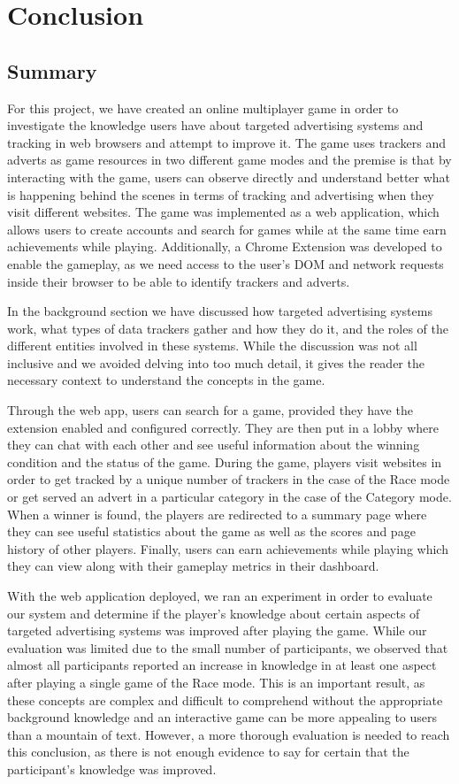 \documentclass{l4proj}
\begin{document}
\chapter{Conclusion}    

\section{Summary}
For this project, we have created an online multiplayer game in order to investigate the knowledge users have about targeted advertising systems and tracking in web browsers and attempt to improve it. The game uses trackers and adverts as game resources in two different game modes and the premise is that by interacting with the game, users can observe directly and understand better what is happening behind the scenes in terms of tracking and advertising when they visit different websites. The game was implemented as a web application, which allows users to create accounts and search for games while at the same time earn achievements while playing. Additionally, a Chrome Extension was developed to enable the gameplay, as we need access to the user's DOM and network requests inside their browser to be able to identify trackers and adverts. 

In the background section we have discussed how targeted advertising systems work, what types of data trackers gather and how they do it, and the roles of the different entities involved in these systems. While the discussion was not all inclusive and we avoided delving into too much detail, it gives the reader the necessary context to understand the concepts in the game. 

Through the web app, users can search for a game, provided they have the extension enabled and configured correctly. They are then put in a lobby where they can chat with each other and see useful information about the winning condition and the status of the game. During the game, players visit websites in order to get tracked by a unique number of trackers in the case of the Race mode or get served an advert in a particular category in the case of the Category mode. When a winner is found, the players are redirected to a summary page where they can see useful statistics about the game as well as the scores and page history of other players. Finally, users can earn achievements while playing which they can view along with their gameplay metrics in their dashboard.

With the web application deployed, we ran an experiment in order to evaluate our system and determine if the player's knowledge about certain aspects of targeted advertising systems was improved after playing the game. While our evaluation was limited due to the small number of participants, we observed that almost all participants reported an increase in knowledge in at least one aspect after playing a single game of the Race mode. This is an important result, as these concepts are complex and difficult to comprehend without the appropriate background knowledge and an interactive game can be more appealing to users than a mountain of text. However, a more thorough evaluation is needed to reach this conclusion, as there is not enough evidence to say for certain that the participant's knowledge was improved. 
\end{document}
